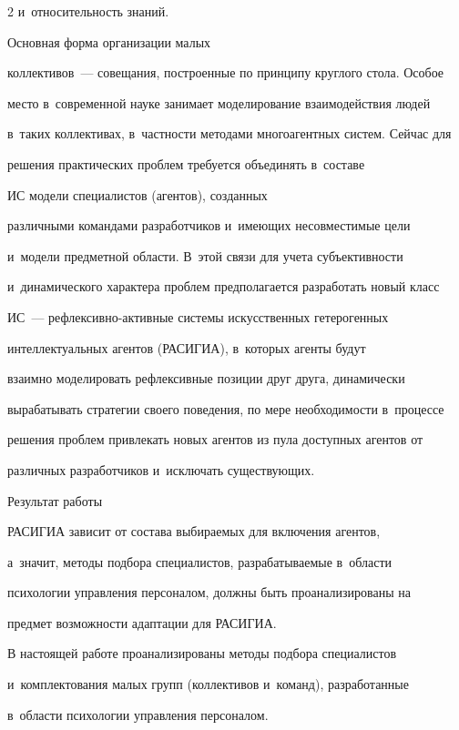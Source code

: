 \begin{multicols}{2}
и~относительность знаний. 



Основная форма организации малых  

коллективов~--- совещания, построенные по принципу круглого стола. Особое 

место в~современной науке занимает моделирование взаимодействия людей 

в~таких коллективах, в~частности методами многоагентных систем. Сейчас для 

решения практических проблем требуется объединять в~составе 

ИС модели специалистов (агентов), созданных 

различными командами разработчиков и~имеющих несовместимые цели 

и~модели предметной области. В~этой связи для учета субъективности 

и~динамического характера проблем предполагается разработать новый класс 

ИС~--- реф\-лек\-сив\-но-ак\-тив\-ные сис\-те\-мы искусственных гетерогенных 

интеллектуальных агентов (\mbox{РАСИГИА}), в~которых агенты будут 

взаимно моделировать рефлексивные позиции друг друга, динамически 

вырабатывать стратегии своего поведения, по мере необходимости в~процессе 

решения проблем привлекать новых агентов из пула доступных агентов от 

различных разработчиков и~исключать существующих. 



Результат работы 

\mbox{РАСИГИА} зависит от состава выбираемых для включения агентов, 

а~значит, методы подбора специалистов, разрабатываемые в~об\-ласти 

психологии управ\-ле\-ния персоналом, должны быть проанализированы на 

предмет возможности адаптации для \mbox{РАСИГИА}. 

  

  В настоящей работе проанализированы методы подбора специалистов 

и~комплектования малых групп (коллективов и~команд), разработанные 

в~области психологии управления персоналом.




\end{multicols}
